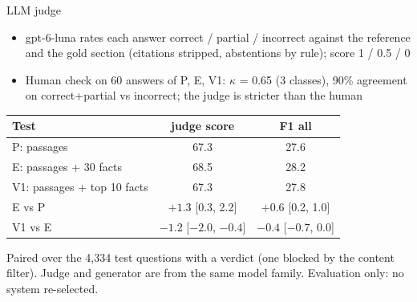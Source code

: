 \documentclass[aspectratio=169,11pt]{beamer}
\newcommand{\up}[1]{{\color{green!45!black}#1}}
\begin{document}
\begin{frame}{LLM judge}
\small
\begin{itemize}
\item gpt-6-luna rates each answer correct / partial / incorrect against the reference and the gold section (citations stripped, abstentions by rule); score 1 / 0.5 / 0
\item Human check on 60 answers of P, E, V1: $\kappa$ = 0.65 (3 classes), 90\% agreement on correct+partial vs incorrect; the judge is stricter than the human %
\end{itemize}

\vspace{2mm}
\centering
\begin{tabular}{lcc}
\toprule
Test & judge score & F1 all \\
\midrule
P: passages & 67.3 & 27.6 \\ %
E: passages + 30 facts & \up{68.5} & \up{28.2} \\ %
V1: passages + top 10 facts & 67.3 & 27.8 \\ %
\midrule
E vs P & $+1.3$ [0.3, 2.2] & $+0.6$ [0.2, 1.0] \\ %
V1 vs E & $-1.2$ [$-2.0$, $-0.4$] & $-0.4$ [$-0.7$, 0.0] \\ %
\bottomrule
\end{tabular}

\vspace{2mm}
\raggedright\scriptsize Paired over the 4,334 test questions with a verdict (one blocked by the content filter). Judge and generator are from the same model family. Evaluation only: no system re-selected.
\end{frame}
\end{document}
